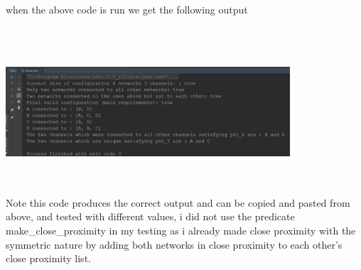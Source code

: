 \documentclass{article}
\begin{document}
\begin{enumerate}[(a)]
\begin{lstlisting}
        \end{lstlisting}
        when the above code is run we get the following output
        \begin{centering}\hspace*{1pt}\\\includegraphics[width=400px, height = 200px]{output3.png}\end{centering}
        
        Note this code produces the correct output and can be copied and pasted from above, and tested with different values, i did not use the predicate make\_close\_proximity in my testing as i already made close proximity with the symmetric nature by adding both networks in close proximity to each other's close proximity list.
        
\end{enumerate}
\end{document}
